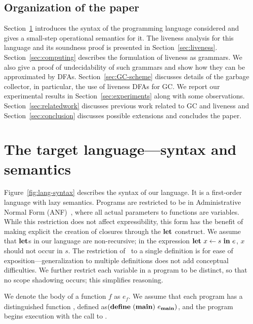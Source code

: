 \documentclass[9pt,nonatbib]{sigplanconf}
\begin{document}
\subsection{Organization of the paper}

Section~\ref{sec:defs}  introduces  the   syntax  of  the  programming
language considered  and gives a small-step  operational semantics for
it.  The liveness  analysis for this language and  its soundness proof
is          presented          in          Section~\ref{sec:liveness}.
Section~\ref{sec:computing} describes  the formulation of  liveness as
grammars. We also give a proof  of undecidability of such grammars and
show     how     they     can     be     approximated     by     DFAs.
Section~\ref{sec:GC-scheme}   discusses   details   of   the   garbage
collector,  in  particular,  the  use  of  liveness  DFAs  for  GC.     We     report    our    experimental     results    in
Section~\ref{sec:experiments}    along    with   some    observations.
Section~\ref{sec:relatedwork}  discusses  previous   work  related  to
GC  and   liveness  and  Section~\ref{sec:conclusion}
discusses possible extensions and concludes the paper.
\section{The target language---syntax and semantics}
\label{sec:defs}
Figure~\ref{fig:lang-syntax} describes the syntax  of our language. It
is a first-order language with lazy semantics. Programs are restricted
to        be        in        Administrative        Normal        Form
(ANF)~\cite{chakravarty03perspective}, where  all actual  parameters to
functions  are  variables.  While  this  restriction  does not  affect
expressibility,  this form  has  the benefit  of  making explicit  the
creation of closures through the $\mbox{$\mathbf{ let}$}$ construct.   We
  assume that  $\mbox{$\mathbf{ let}$}$s  in  our  language  are  non-recursive;  in  the
  expression $\mbox{$\mathbf{ let}$}\,\, x  \leftarrow s\,\, \mbox{$\mathbf{ in}$}\,\, e$,  $x$ should not
  occur in  $s$. The restriction of  \LET\ to a single  definition is
for ease  of exposition---generalization to multiple  definitions does
not add conceptual difficulties.  We further restrict each variable in
a program  to be  distinct, so that  no scope  shadowing occurs; this
simplifies reasoning.


We denote the body of a function ${\mathit  f}$   as $e_{\mathit f}$.
 We assume that each program has a distinguished function
\mainpgm,    defined as\linebreak    $(\mbox{$\mathbf{define}$}\      ({\tt
  \mathbf{main}})\  e_{\mathbf{main}})$,  and  the program begins execution
with the call to \mainpgm.  
\end{document}
